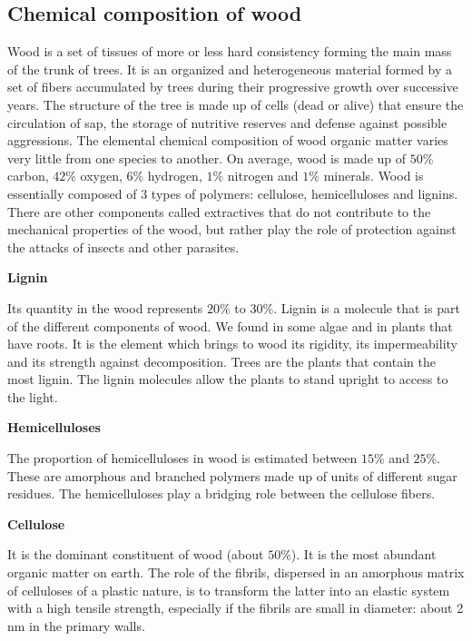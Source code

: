 \subsection{Chemical composition of wood}

Wood is a set of tissues of more or less hard consistency forming the main mass of the trunk of trees. It is an organized and heterogeneous material formed by a set of fibers accumulated by trees during their progressive growth over successive years. The structure of the tree is made up of cells (dead or alive) that ensure the circulation of sap, the storage of nutritive reserves and defense against possible aggressions.
The elemental chemical composition of wood organic matter varies very little from one species to another. On average, wood is made up of $50 \%$ carbon, $42 \%$ oxygen, $6 \%$ hydrogen, $1 \%$ nitrogen and $1 \%$ minerals. Wood is essentially composed of 3 types of polymers: cellulose, hemicelluloses and lignins. There are other components called extractives that do not contribute to the mechanical properties of the wood, but rather play the role of protection against the attacks of insects and other parasites.

\smallskip

\textbf{Lignin}

Its quantity in the wood represents $20 \%$ to $30 \%$. Lignin is a molecule that is part of the different components of wood. We found in some algae and in plants that have roots. It is the element which brings to wood its rigidity, its impermeability and its strength against decomposition. Trees are the plants that contain the most lignin. The lignin molecules allow the plants to stand upright to access to the light.

\smallskip

\textbf{Hemicelluloses}

The proportion of hemicelluloses in wood is estimated between $15 \%$ and $25 \%$. These are amorphous and branched polymers made up of units of different sugar residues. The hemicelluloses play a bridging role between the cellulose fibers.

\smallskip

\textbf{Cellulose}

It is the dominant constituent of wood (about $50 \%$). It is the most abundant organic matter on earth. The role of the fibrils, dispersed in an amorphous matrix of celluloses of a plastic nature, is to transform the latter into an elastic system with a high tensile strength, especially if the fibrils are small in diameter: about 2 nm in the primary walls.

